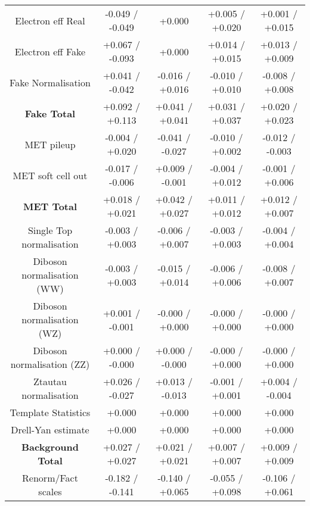 \begin{table}[htbp]
\begin{center}
\begin{tabular}{|c|c|c|c|c|}
Electron eff Real                     &-0.049   / -0.049   & +0.000              & +0.005   / +0.020   & +0.001   / +0.015  \\
Electron eff Fake                     &+0.067   / -0.093   & +0.000              & +0.014   / +0.015   & +0.013   / +0.009  \\
Fake Normalisation                    &+0.041   / -0.042   & -0.016   / +0.016   & -0.010   / +0.010   & -0.008   / +0.008  \\
\hline
\textbf{Fake Total}                   &+0.092   / +0.113   & +0.041   / +0.041   & +0.031   / +0.037   & +0.020   / +0.023  \\
\hline
MET pileup                            &-0.004   / +0.020   & -0.041   / -0.027   & -0.010   / +0.002   & -0.012   / -0.003  \\
MET soft cell out                     &-0.017   / -0.006   & +0.009   / -0.001   & -0.004   / +0.012   & -0.001   / +0.006  \\
\hline
\textbf{MET Total}                    &+0.018   / +0.021   & +0.042   / +0.027   & +0.011   / +0.012   & +0.012   / +0.007  \\
\hline
Single Top normalisation              &-0.003   / +0.003   & -0.006   / +0.007   & -0.003   / +0.003   & -0.004   / +0.004  \\
Diboson normalisation (WW)            &-0.003   / +0.003   & -0.015   / +0.014   & -0.006   / +0.006   & -0.008   / +0.007  \\
Diboson normalisation (WZ)            &+0.001   / -0.001   & -0.000   / +0.000   & -0.000   / +0.000   & -0.000   / +0.000  \\
Diboson normalisation (ZZ)            &+0.000   / -0.000   & +0.000   / -0.000   & -0.000   / +0.000   & -0.000   / +0.000  \\
Ztautau normalisation                 &+0.026   / -0.027   & +0.013   / -0.013   & -0.001   / +0.001   & +0.004   / -0.004  \\
Template Statistics                   &+0.000              & +0.000              & +0.000              & +0.000             \\
Drell-Yan estimate                    &+0.000              & +0.000              & +0.000              & +0.000             \\
\hline
\textbf{Background Total}             &+0.027   / +0.027   & +0.021   / +0.021   & +0.007   / +0.007   & +0.009   / +0.009  \\
\hline
Renorm/Fact scales                    &-0.182   / -0.141   & -0.140   / +0.065   & -0.055   / +0.098   & -0.106   / +0.061  \\

\end{tabular}
\end{center}
\end{table}
